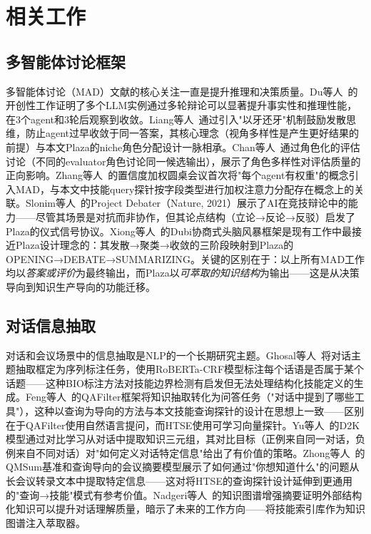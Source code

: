 \documentclass[conference]{IEEEtran}
\begin{document}
\section{相关工作}

\subsection{多智能体讨论框架}

多智能体讨论（MAD）文献的核心关注一直是提升推理和决策质量。Du等人~\cite{du2023improving}的开创性工作证明了多个LLM实例通过多轮辩论可以显著提升事实性和推理性能，在3个agent和3轮后观察到收敛。Liang等人~\cite{liang2023encouraging}通过引入"以牙还牙"机制鼓励发散思维，防止agent过早收敛于同一答案，其核心理念（视角多样性是产生更好结果的前提）与本文Plaza的niche角色分配设计一脉相承。Chan等人~\cite{chan2023chateval}通过角色化的评估讨论（不同的evaluator角色讨论同一候选输出），展示了角色多样性对评估质量的正向影响。Zhang等人~\cite{zhang2024reconcile}的置信度加权圆桌会议首次将"每个agent有权重"的概念引入MAD，与本文中技能query探针按字段类型进行加权注意力分配存在概念上的关联。Slonim等人~\cite{slonim2021autonomous}的Project Debater（Nature, 2021）展示了AI在竞技辩论中的能力——尽管其场景是对抗而非协作，但其论点结构（立论→反论→反驳）启发了Plaza的仪式信号协议。Xiong等人~\cite{xiong2023dubi}的Dubi协商式头脑风暴框架是现有工作中最接近Plaza设计理念的：其发散→聚类→收敛的三阶段映射到Plaza的OPENING→DEBATE→SUMMARIZING。关键的区别在于：以上所有MAD工作均以\emph{答案或评价}为最终输出，而Plaza以\emph{可萃取的知识结构}为输出——这是从决策导向到知识生产导向的功能迁移。

\subsection{对话信息抽取}

对话和会议场景中的信息抽取是NLP的一个长期研究主题。Ghosal等人~\cite{ghosal2021dialogue}将对话主题抽取框定为序列标注任务，使用RoBERTa-CRF模型标注每个话语是否属于某个话题——这种BIO标注方法对技能边界检测有启发但无法处理结构化技能定义的生成。Feng等人~\cite{feng2021language}的QAFilter框架将知识抽取转化为问答任务（"对话中提到了哪些工具"），这种以查询为导向的方法与本文技能查询探针的设计在思想上一致——区别在于QAFilter使用自然语言提问，而HTSE使用可学习向量探针。Yu等人~\cite{yu2022d2k}的D2K模型通过对比学习从对话中提取知识三元组，其对比目标（正例来自同一对话，负例来自不同对话）对"如何定义对话特定信息"给出了有价值的策略。Zhong等人~\cite{zhong2021qmsum}的QMSum基准和查询导向的会议摘要模型展示了如何通过"你想知道什么"的问题从长会议转录文本中提取特定信息——这对将HTSE的查询探针设计延伸到更通用的"查询→技能"模式有参考价值。Nadgeri等人~\cite{nadgeri2021kg}的知识图谱增强摘要证明外部结构化知识可以提升对话理解质量，暗示了未来的工作方向——将技能索引库作为知识图谱注入萃取器。
\end{document}

